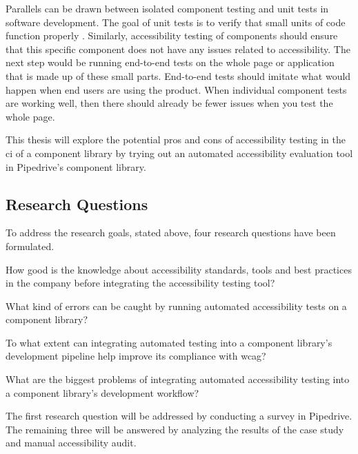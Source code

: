 \documentclass{master_thesis}
\begin{document}
Parallels can be drawn between isolated component testing and unit tests in software development. The goal of unit tests is to verify that small units of code function properly \citep[p.60]{Humble2010}. Similarly, accessibility testing of components should ensure that this specific component does not have any issues related to accessibility. The next step would be running end-to-end tests on the whole page or application that is made up of these small parts. End-to-end tests should imitate what would happen when end users are using the product. When individual component tests are working well, then there should already be fewer issues when you test the whole page.

This thesis will explore the potential pros and cons of accessibility testing in the \ac{ci} of a component library by trying out an automated accessibility evaluation tool in Pipedrive's component library.

\subsection{Research Questions}

To address the research goals, stated above, four research questions have been formulated.

	\begin{RQlist}
		\item How good is the knowledge about accessibility standards, tools and best practices in the company before integrating the accessibility testing tool?
		\item What kind of errors can be caught by running automated accessibility tests on a component library?
		\item To what extent can integrating automated testing into a component library's development pipeline help improve its compliance with \ac{wcag}?
		\item What are the biggest problems of integrating automated accessibility testing into a component library's development workflow?
	\end{RQlist}

The first research question will be addressed by conducting a survey in Pipedrive. The remaining three will be answered by analyzing the results of the case study and manual accessibility audit.
\end{document}
